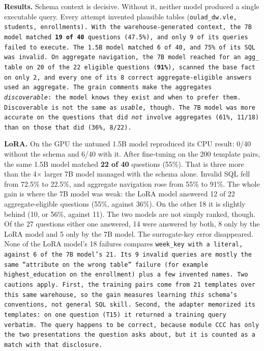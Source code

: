 \textbf{Results.} Schema context is decisive. Without it, neither model produced a single executable query. Every
attempt invented plausible tables (\tt{oulad\_dw.vle}, \tt{students}, \tt{enrollments}). With the
warehouse-generated context, the 7B model matched \textbf{19 of 40} questions (47.5\%), and only 9 of its queries
failed to execute. The 1.5B model matched 6 of 40, and 75\% of its SQL was invalid. On aggregate navigation, the
7B model reached for an \tt{agg\_} table on 20 of the 22 eligible questions (\textbf{91\%}), scanned the base fact
on only 2, and every one of its 8 correct aggregate-eligible answers used an aggregate. The grain comments make
the aggregates \emph{discoverable}: the model knows they exist and when to prefer them. Discoverable is not the
same as \emph{usable}, though. The 7B model was more accurate on the questions that did \emph{not} involve
aggregates (61\%, 11/18) than on those that did (36\%, 8/22).

\textbf{LoRA.} On the GPU the untuned 1.5B model reproduced its CPU result: 0/40 without the schema and 6/40 with
it. After fine-tuning on the 200 template pairs, the same 1.5B model matched \textbf{22 of 40} questions
(55\%). That is three more than the 4$\times$ larger 7B model managed with the schema alone. Invalid SQL fell from
72.5\% to 22.5\%, and aggregate navigation rose from 55\% to 91\%. The whole gain is where the 7B model was weak: the
LoRA model answered 12 of 22 aggregate-eligible questions (55\%, against 36\%). On the other 18 it is slightly
behind (10, or 56\%, against 11). The two models
are not simply ranked, though. Of the 27 questions either one answered, 14 were answered by both, 8 only by the
LoRA model and 5 only by the 7B model. The surrogate-key error disappeared. None of the LoRA model's 18 failures
compares \tt{week\_key} with a literal, against 6 of the 7B model's 21. Its 9 invalid queries are mostly the
same ``attribute on the wrong table'' failure (for example \tt{highest\_education} on the enrollment) plus a few
invented names. Two cautions apply. First, the training pairs come from 21 templates over this same warehouse, so
the gain measures learning \emph{this} schema's conventions, not general SQL skill. Second, the adapter
memorized its templates: on one question (T15) it returned a training query verbatim. The query happens to be
correct, because module CCC has only the two presentations the question asks about, but it is counted as a
match with that disclosure.

